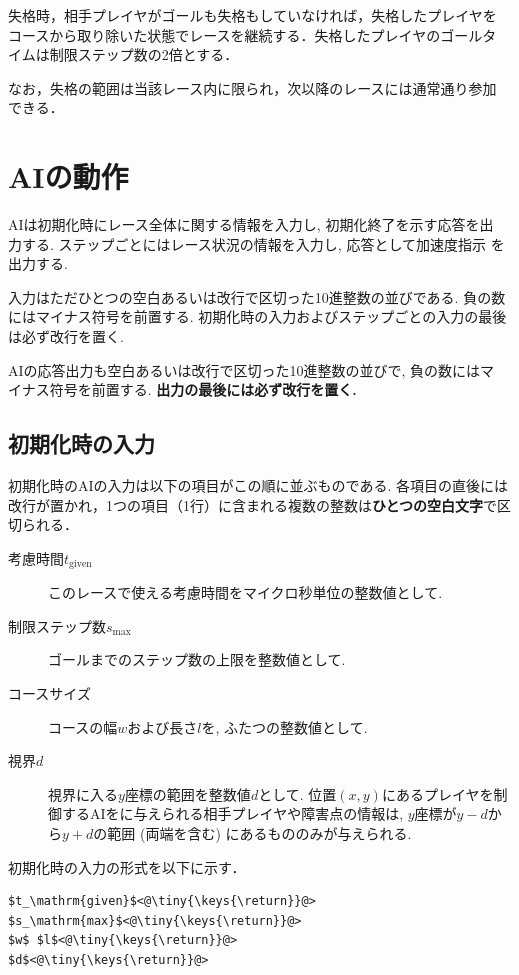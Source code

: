 \documentclass[11pt]{jarticle}
\begin{document}
失格時，相手プレイヤがゴールも失格もしていなければ，失格したプレイヤを
コースから取り除いた状態でレースを継続する．失格したプレイヤのゴールタ
イムは制限ステップ数の2倍とする．

なお，失格の範囲は当該レース内に限られ，次以降のレースには通常通り参加
できる．

\section{AIの動作}
AIは初期化時にレース全体に関する情報を入力し, 初期化終了を示す応答を出
力する. ステップごとにはレース状況の情報を入力し, 応答として加速度指示
を出力する.

入力はただひとつの空白あるいは改行で区切った10進整数の並びである.
負の数にはマイナス符号を前置する.
初期化時の入力およびステップごとの入力の最後は必ず改行を置く.

AIの応答出力も空白あるいは改行で区切った10進整数の並びで, 負の数にはマ
イナス符号を前置する.  {\bf 出力の最後には必ず改行を置く.}

\subsection{初期化時の入力}
初期化時のAIの入力は以下の項目がこの順に並ぶものである.
各項目の直後には改行が置かれ，1つの項目（1行）に含まれる複数の整数は{\bf ひとつの空白文字}で区切られる．
\begin{description}
\item[考慮時間$t_\mathrm{given}$] このレースで使える考慮時間をマイクロ秒単位の整数値として.
\item[制限ステップ数$s_\mathrm{max}$] ゴールまでのステップ数の上限を整数値として.
\item[コースサイズ] コースの幅$w$および長さ$l$を, ふたつの整数値として.
\item[視界$d$] 視界に入る$y$座標の範囲を整数値$d$として.
  位置$(x,y)$にあるプレイヤを制御するAIをに与えられる相手プレイヤや障害点の情報は, 
  $y$座標が$y-d$から$y+d$の範囲 (両端を含む) にあるもののみが与えられる.
\end{description}

\makeatletter
\def\lst@visiblespace{$\color{Gray}{}_{
  \mbox{\kern.06em\vrule \@height.3ex}%
  \vbox{\hrule \@width.3em}%
  \hbox{\vrule \@height.3ex}}$}
\makeatother


初期化時の入力の形式を以下に示す．
\begin{lstlisting}
$t_\mathrm{given}$<@\tiny{\keys{\return}}@>
$s_\mathrm{max}$<@\tiny{\keys{\return}}@>
$w$ $l$<@\tiny{\keys{\return}}@>
$d$<@\tiny{\keys{\return}}@>
\end{lstlisting}
\end{document}
